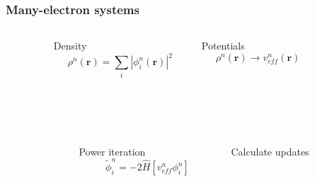 
\begin{frame}
    \frametitle{Many-electron systems}
    \begin{columns}
    \begin{column}[b]{0.1\textwidth}
    \ \\
    \end{column}
    \begin{column}[b]{0.4\textwidth}
    \centering
    Density
    \begin{equation}
	\nonumber
	\rho^n(\boldsymbol{r}) = \sum_i |\phi_i^n(\boldsymbol{r})|^2
    \end{equation}
    \end{column}
    \begin{column}[b]{0.4\textwidth}
    \centering
    Potentials
    \begin{equation}   
	\nonumber
	\rho^n(\boldsymbol{r}) \rightarrow v_{eff}^n(\boldsymbol{r})
    \end{equation}
    \end{column}
    \begin{column}[b]{0.1\textwidth}
    \ \\
    \end{column}
    \end{columns}
    \ \\
    \ \\
    \begin{columns}
    \begin{column}[b]{0.1\textwidth}
    \ \\
    \end{column}
    \begin{column}[b]{0.4\textwidth}
    \centering
    Power iteration
    \begin{equation}
	\nonumber
	\tilde{\phi}_i^n = -2\hat{H}\left[v_{eff}^n\phi_i^n\right]
    \end{equation}
    \end{column}
    \begin{column}[b]{0.4\textwidth}
    \centering
    Calculate updates

\end{column}
\end{columns}
\end{frame}
